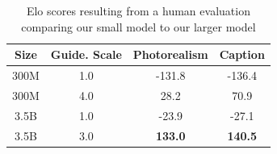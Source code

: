 \documentclass{article}
\begin{document}
\begin{table}[t]
    \caption{Elo scores resulting from a human evaluation comparing our small model to our larger model}
    \label{tab:humaneval_modelsize}
    \vskip 0.15in
    \centering
    \begin{center}
    \begin{small}
    \begin{tabular}{cccc}
    \toprule
    Size & Guide. Scale & Photorealism & Caption \\
    \midrule
    300M & 1.0 & -131.8 & -136.4 \\
    300M & 4.0 & 28.2 & 70.9 \\
    3.5B & 1.0 & -23.9 & -27.1 \\
    3.5B & 3.0 & \bf 133.0 & \bf 140.5 \\
    \bottomrule
    \end{tabular}
    \end{small}
    \end{center}
    \vskip -0.2in
\end{table}
\end{document}
